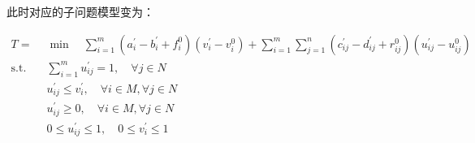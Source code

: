 \documentclass[UTF8]{article}
\begin{document}
此时对应的子问题模型变为：

\begin{align*}
T = &\min \quad \sum_{i=1}^m(a_i^{'}-b_i^{'}+f_i^0)(v_i^{'}-v_i^{0})+\sum_{i=1}^m\sum_{j=1}^n(c_{ij}^{'}-d_{ij}^{'}+r_{ij}^0)(u_{ij}^{'}-u_{ij}^{0}) \\
\text{s.t.}\quad & \sum_{i=1}^m u_{ij}^{'} =1, \quad \forall j\in N \\
& u_{ij}^{'} \leq v_{i}^{'}, \quad \forall i \in M, \forall j \in N \\
& u_{ij}^{'} \geq 0, \quad \forall i \in M, \forall j \in N \\
& 0 \leq u_{ij}^{'} \leq 1 ,\quad 0 \leq v_{i}^{'} \leq 1
\end{align*}


%
%
\end{document}
